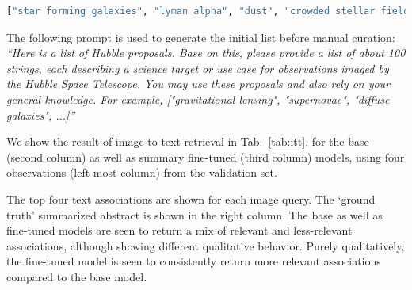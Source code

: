 \documentclass{article} %
\begin{document}
\begin{lstlisting}[language=Python]
["star forming galaxies", "lyman alpha", "dust", "crowded stellar field", "core-collapse supernova", "cosmology", "gravitational lensing", "supernovae", "diffuse galaxies", "globular clusters", "stellar populations", "interstellar medium", "black holes", "dark matter", "galaxy clusters", "galaxy evolution", "galaxy formation", "quasars", "circumstellar disks", "exoplanets", "Kuiper Belt objects", "solar system objects", "cosmic web structure", "distant galaxies", "galaxy mergers", "galaxy interactions", "star formation", "stellar winds", "brown dwarfs", "white dwarfs", "nebulae", "star clusters", "galaxy archeology", "galactic structure", "active galactic nuclei", "gamma-ray bursts", "stellar nurseries", "intergalactic medium", "dark energy", "dwarf galaxies", "barred spiral galaxies", "irregular galaxies", "starburst galaxies", "low surface brightness galaxies", "ultra diffuse galaxies", "circumgalactic medium", "intracluster medium", "cosmic dust", "interstellar chemistry", "star formation histories", "initial mass function", "stellar proper motions", "binary star systems", "open clusters", "pre-main sequence stars", "protostars", "protoplanetary disks", "jets and outflows", "interstellar shocks", "planetary nebulae", "supernova remnants", "red giants", "Cepheid variables", "RR Lyrae variables", "stellar abundances", "stellar dynamics", "compact stellar remnants", "Einstein rings", "trans-Neptunian objects", "cosmic microwave background", "reionization epoch", "first stars", "first galaxies", "high-redshift quasars", "primordial black holes", "resolved binaries", "binary stars"]
\end{lstlisting}

The following prompt is used to generate the initial list before manual curation: \emph{``Here is a list of Hubble proposals. Base on this, please provide a list of about 100 strings, each describing a science target or use case for observations imaged by the Hubble Space Telescope. You may use these proposals and also rely on your general knowledge. For example, ["gravitational lensing", "supernovae", "diffuse galaxies", ...]''}

  We show the result of image-to-text retrieval in Tab.~\ref{tab:itt}, for the base (second column) as well as summary fine-tuned (third column) models, using four observations (left-most column) from the validation set.
  
  The top four text associations are shown for each image query.
  The `ground truth' summarized abstract is shown in the right column.
  The base as well as fine-tuned models are seen to return a mix of relevant and less-relevant associations, although showing different qualitative behavior. Purely qualitatively, the fine-tuned model is seen to consistently return more relevant associations compared to the base model.
  
\end{document}
